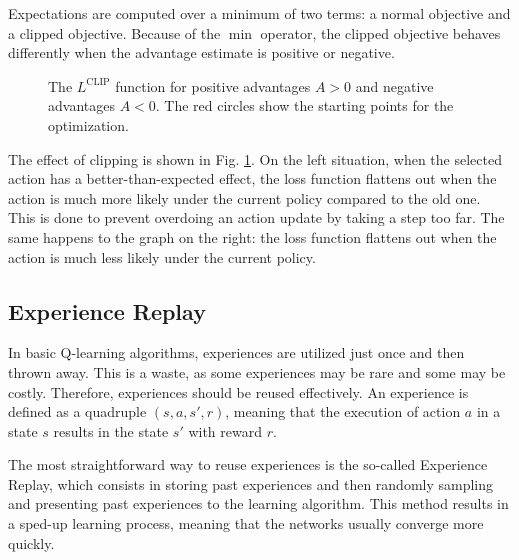\documentclass[a4paper, 12pt]{article}
\numberwithin{equation}{section}
\begin{document}
Expectations are computed over a minimum of two terms: a normal objective and a clipped objective. Because of the $\min$ operator, the clipped objective behaves differently when the advantage estimate is positive or negative.

\begin{figure}[h]
	\centering
		\caption{The $L^\mathrm{CLIP}$ function for positive advantages $A>0$ and negative advantages $A<0$. The red circles show the starting points for the optimization.}
	\label{fig:clipped}
\end{figure}

The effect of clipping is shown in Fig. \ref{fig:clipped}. On the left situation, when the selected action has a better-than-expected effect, the loss function flattens out when the action is much more likely under the current policy compared to the old one. This is done to prevent overdoing an action update by taking a step too far. The same happens to the graph on the right: the loss function flattens out when the action is much less likely under the current policy.



\subsection[Experience Replay]{Experience Replay \cite{experience-replay}}

In basic Q-learning algorithms, experiences are utilized just once and then thrown away. This is a waste, as some experiences may be rare and some may be costly. Therefore, experiences should be reused effectively. An experience is defined as a quadruple $\left(s,a,s',r\right)$, meaning that the execution of action $a$ in a state $s$ results in the state $s'$ with reward $r$.

The most straightforward way to reuse experiences is the so-called Experience Replay, which consists in storing past experiences and then randomly sampling and presenting past experiences to the learning algorithm. This method results in a sped-up learning process, meaning that the networks usually converge more quickly.
\end{document}
